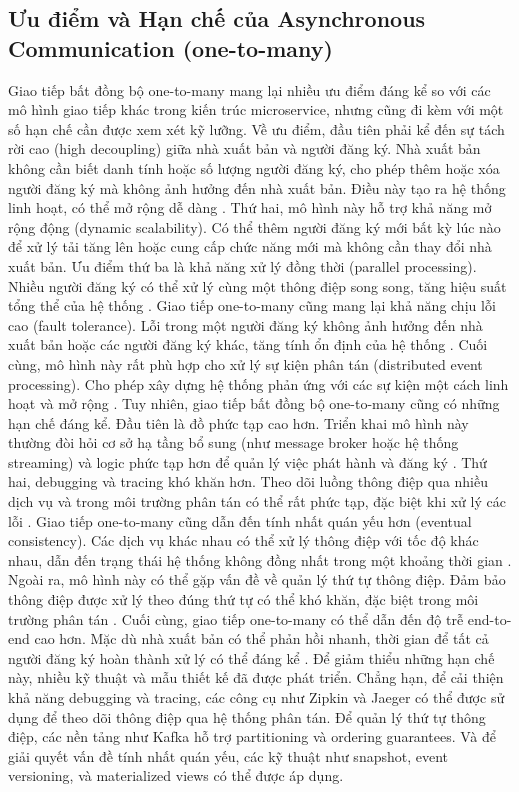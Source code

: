 \subsection{Ưu điểm và Hạn chế của Asynchronous Communication (one-to-many)}
Giao tiếp bất đồng bộ one-to-many mang lại nhiều ưu điểm đáng kể so với các mô hình giao tiếp khác trong kiến trúc microservice, nhưng cũng đi kèm với một số hạn chế cần được xem xét kỹ lưỡng.
Về ưu điểm, đầu tiên phải kể đến sự tách rời cao (high decoupling) giữa nhà xuất bản và người đăng ký. Nhà xuất bản không cần biết danh tính hoặc số lượng người đăng ký, cho phép thêm hoặc xóa người đăng ký mà không ảnh hưởng đến nhà xuất bản. Điều này tạo ra hệ thống linh hoạt, có thể mở rộng dễ dàng \cite{newman2015}. Thứ hai, mô hình này hỗ trợ khả năng mở rộng động (dynamic scalability). Có thể thêm người đăng ký mới bất kỳ lúc nào để xử lý tải tăng lên hoặc cung cấp chức năng mới mà không cần thay đổi nhà xuất bản. Ưu điểm thứ ba là khả năng xử lý đồng thời (parallel processing). Nhiều người đăng ký có thể xử lý cùng một thông điệp song song, tăng hiệu suất tổng thể của hệ thống \cite{wolff2016}. Giao tiếp one-to-many cũng mang lại khả năng chịu lỗi cao (fault tolerance). Lỗi trong một người đăng ký không ảnh hưởng đến nhà xuất bản hoặc các người đăng ký khác, tăng tính ổn định của hệ thống \cite{richardson2019}. Cuối cùng, mô hình này rất phù hợp cho xử lý sự kiện phân tán (distributed event processing). Cho phép xây dựng hệ thống phản ứng với các sự kiện một cách linh hoạt và mở rộng \cite{hohpe2004}.
Tuy nhiên, giao tiếp bất đồng bộ one-to-many cũng có những hạn chế đáng kể. Đầu tiên là đồ phức tạp cao hơn. Triển khai mô hình này thường đòi hỏi cơ sở hạ tầng bổ sung (như message broker hoặc hệ thống streaming) và logic phức tạp hơn để quản lý việc phát hành và đăng ký \cite{newman2015}. Thứ hai, debugging và tracing khó khăn hơn. Theo dõi luồng thông điệp qua nhiều dịch vụ và trong môi trường phân tán có thể rất phức tạp, đặc biệt khi xử lý các lỗi \cite{wolff2016}. Giao tiếp one-to-many cũng dẫn đến tính nhất quán yếu hơn (eventual consistency). Các dịch vụ khác nhau có thể xử lý thông điệp với tốc độ khác nhau, dẫn đến trạng thái hệ thống không đồng nhất trong một khoảng thời gian \cite{richardson2019}. Ngoài ra, mô hình này có thể gặp vấn đề về quản lý thứ tự thông điệp. Đảm bảo thông điệp được xử lý theo đúng thứ tự có thể khó khăn, đặc biệt trong môi trường phân tán \cite{aksakalli2021}. Cuối cùng, giao tiếp one-to-many có thể dẫn đến độ trễ end-to-end cao hơn. Mặc dù nhà xuất bản có thể phản hồi nhanh, thời gian để tất cả người đăng ký hoàn thành xử lý có thể đáng kể \cite{jun2018}.
Để giảm thiểu những hạn chế này, nhiều kỹ thuật và mẫu thiết kế đã được phát triển. Chẳng hạn, để cải thiện khả năng debugging và tracing, các công cụ như Zipkin và Jaeger có thể được sử dụng để theo dõi thông điệp qua hệ thống phân tán. Để quản lý thứ tự thông điệp, các nền tảng như Kafka hỗ trợ partitioning và ordering guarantees. Và để giải quyết vấn đề tính nhất quán yếu, các kỹ thuật như snapshot, event versioning, và materialized views có thể được áp dụng.
